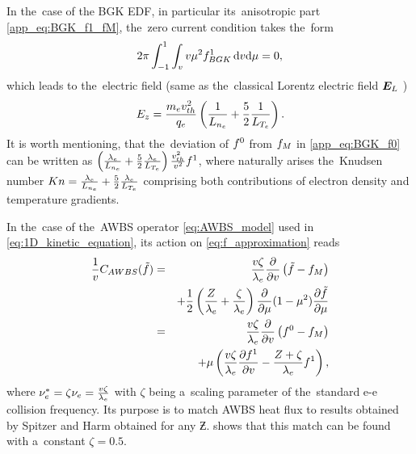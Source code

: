 In the~case of the BGK EDF, in particular its~anisotropic part 
\eqref{app_eq:BGK_f1_fM}, the~zero current condition takes the~form
\begin{equation}
  2\pi\int_{-1}^{1} \int_{v} v \mu^2 f^1_{BGK}\, \text{d}v\text{d}\mu = 0 ,
  \nonumber
\end{equation}
which leads to the~electric field (same as the~classical Lorentz electric field
$\boldsymbol{E}_L$ \cite{Lorentz_1905})
\begin{equation}
  E_z = \frac{m_ev_{th}^2}{q_e}\left(\frac{1}{L_{n_e}} 
  + \frac{5}{2}\frac{1}{L_{T_e}} \right) .
  \label{app_eq:BGK_Efield}
\end{equation}
It is worth mentioning, that the~deviation of $f^0$ from $f_M$ in 
\eqref{app_eq:BGK_f0} can be written as $\left(\frac{\lambda_e}{L_{n_e}} 
  + \frac{5}{2}\frac{\lambda_e}{L_{T_e}} \right)\frac{v_{th}^2}{v^2}f^1$,
where naturally arises the~Knudsen number 
$Kn = \frac{\lambda_e}{L_{n_e}} + \frac{5}{2}\frac{\lambda_e}{L_{T_e}}$ comprising
both contributions of electron density and temperature gradients.

In the~case of the~AWBS operator \eqref{eq:AWBS_model} used in 
\eqref{eq:1D_kinetic_equation}, its action on \eqref{eq:f_approximation} reads
\begin{eqnarray}
  \frac{1}{v}C_{AWBS}(\tilde{f})
  &=& 
  \frac{v\zeta}{\lambda_e} \frac{\partial{}}{\partial{v}}\left(\tilde{f} - f_M\right) 
  \nonumber \\
  && + \frac{1}{2}\left(\frac{Z}{\lambda_e} + \frac{\zeta}{\lambda_e}\right)
  \frac{\partial{}}{\partial{\mu}}(1 - \mu^2)\frac{\partial{\tilde{f}}}{\partial{\mu}}  \nonumber \\
  &=& \frac{v\zeta}{\lambda_e} \frac{\partial{}}{\partial{v}}\left(f^0 - f_M\right) \nonumber \\ 
  &&\, + \mu\left(\frac{v\zeta}{\lambda_e} \frac{\partial{f^1}}{\partial{v}} 
  - \frac{Z+\zeta}{\lambda_e}f^1\right) ,
  \label{app_eq:AWBS_model_1D}
\end{eqnarray}
where $\nu_{e}^* = \zeta \nu_{e} = \frac{v\zeta}{\lambda_e}$ with $\zeta$ being a~scaling
parameter of the~standard e-e collision frequency. Its purpose is to
match AWBS heat flux to results obtained by Spitzer and Harm 
\cite{SpitzerHarm_PR1953} obtained for any $\Zbar$. 
 shows that this match can be found with 
a~constant $\zeta=0.5$.

